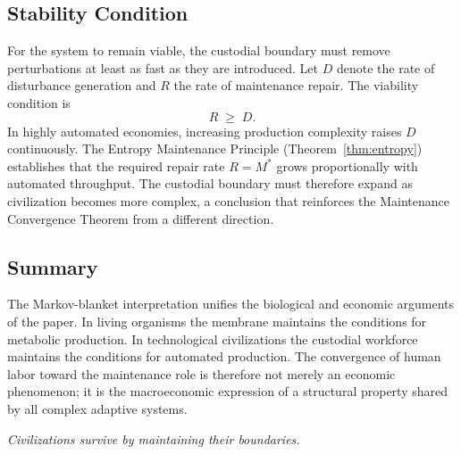\documentclass[12pt,a4paper]{article}
\theoremstyle{plain}
\theoremstyle{definition}
\theoremstyle{remark}
\begin{document}
\subsection{Stability Condition}

For the system to remain viable, the custodial boundary must remove
perturbations at least as fast as they are introduced.  Let $D$ denote the
rate of disturbance generation and $R$ the rate of maintenance repair.  The
viability condition is
\[
R \;\geq\; D.
\]
In highly automated economies, increasing production complexity raises $D$
continuously.  The Entropy Maintenance Principle (Theorem~\ref{thm:entropy})
establishes that the required repair rate $R = M^*$ grows proportionally with
automated throughput.  The custodial boundary must therefore expand as
civilization becomes more complex, a conclusion that reinforces the
Maintenance Convergence Theorem from a different direction.

\subsection{Summary}

The Markov-blanket interpretation unifies the biological and economic
arguments of the paper.  In living organisms the membrane maintains the
conditions for metabolic production.  In technological civilizations the
custodial workforce maintains the conditions for automated production.  The
convergence of human labor toward the maintenance role is therefore not merely
an economic phenomenon; it is the macroeconomic expression of a structural
property shared by all complex adaptive systems.

\bigskip
\begin{center}
\textit{Civilizations survive by maintaining their boundaries.}
\end{center}
\end{document}

